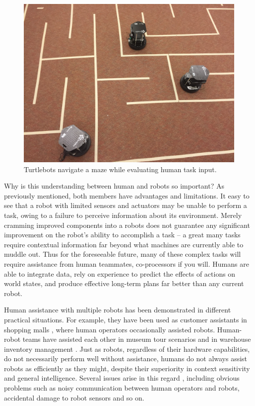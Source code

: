 \documentclass{sig-alternate}
\begin{document}
\begin{figure}
\centering
\includegraphics[width=.5\textwidth]{robots-in-maze.jpg}
\caption{Turtlebots navigate a maze while evaluating human task input.}
\label{fig:game_photo}
\end{figure}

Why is this understanding between human and robots so important? As
previously mentioned, both members have advantages and limitations. It
easy to see that a robot with limited sensors and actuators may be unable
to perform a task, owing to a failure to perceive information about its
environment. Merely cramming improved components into a robots does
not guarantee any significant improvement on the robot's ability to
accomplish a task -- a great many tasks require contextual information far
beyond what machines are currently able to muddle out. Thus for the
foreseeable future, many of these complex tasks will require assistance
from human teammates, co-processors if you will. Humans are able to
integrate data, rely on experience to predict the effects of actions on world
states, and produce effective long-term plans far better than any current
robot.

Human assistance with multiple robots has been demonstrated in
different practical situations. For example, they have been used as
customer assistants in shopping malls \cite{zheng2013supervisory,
  Kanda:2009:AGR:1514095.1514127}, where human operators occasionally
assisted robots. Human-robot teams have assisted each other in museum
tour scenarios \cite{thrun1999minerva} and in warehouse inventory
management \cite{wurman2008coordinating}.  Just as robots, regardless
of their hardware capabilities, do not necessarily perform well
without assistance, humans do not always assist robots as efficiently
as they might, despite their superiority in context sensitivity and
general intelligence.  Several issues arise in this regard
\cite{breazeal2004social}, including obvious problems such as noisy
communication between human operators and robots, accidental damage to robot sensors and so on.
\end{document}
